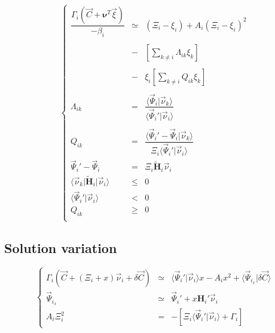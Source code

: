 \documentclass[aps,12pt]{revtex4}
\begin{document}
\begin{equation}
\left\lbrace
\begin{array}{rcl}
	\displaystyle \dfrac{\Gamma_i(\vec{C} + \bm{\nu}^T\vec{\xi})}{-\beta_i} & \simeq & \left( \Xi_i -\xi_i\right) + A_i \left(  \Xi_i -\xi_i\right)^2\\
	\\
	& - & \displaystyle \left[ \sum_{k\not=i} \Lambda_{ik} \xi_k \right] \\
	\\
	& - & \displaystyle 
	\xi_i \left[  \sum_{k\not=i} Q_{ik} \xi_k \right] \\
	\\
	\Lambda_{ik} & = & \displaystyle \dfrac{\langle \vec{\Psi}_i \vert \vec{\nu}_k \rangle}{\langle \vec{\Psi}_i' \vert \vec{\nu}_i \rangle}\\
	\\
	Q_{ik} & = & \displaystyle \dfrac{\langle \vec{\Psi}_i'-\vec{\Psi}_i \vert \vec{\nu}_k \rangle}{\Xi_i \langle \vec{\Psi}_i' \vert \vec{\nu}_i \rangle}\\
	\vec{\Psi}_i'-\vec{\Psi}_i  & = & \Xi_i \tilde{\bm{H}}_i \vec{\nu}_i\\
	
	\langle \vec{\nu}_k \vert \tilde{\bm{H}}_i \vert \vec{\nu}_i \rangle & \leq & 0\\
	\langle \vec{\Psi}_i' \vert \vec{\nu}_i \rangle & < & 0\\
	Q_{ik} & \geq & 0\\
\end{array}
\right.
\end{equation}

 
\subsection{Solution variation}

\begin{equation}
\left\lbrace
\begin{array}{rcl}
	\Gamma_i(\vec{C}+(\Xi_i+x)\vec{\nu}_i + \delta\vec{C}) & \simeq & \langle \vec{\Psi}_i' \vert \vec{\nu}_i \rangle x - A_i x^2 
	+ \langle \vec{\Psi}_{i_x} \vert \delta\vec{C} \rangle\\
	\vec{\Psi}_{i_x} & \simeq & \vec{\Psi}_i' + x \bm{H}_i' \vec{\nu}_i \\
	A_i \Xi_i^2 & = & -\left[ \Xi_i \langle \vec{\Psi}_i' \vert \vec{\nu}_i \rangle + \Gamma_i \right] 
\end{array}
\right.
\end{equation}
\end{document}
